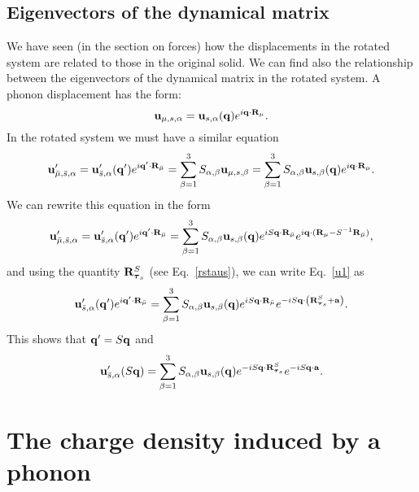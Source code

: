 \documentclass[12pt,a4paper,twoside]{report}
\begin{document}
\subsection{Eigenvectors of the dynamical matrix}
We have seen (in the section on forces) how the displacements in the rotated system are related to those in the original solid. We can find also the relationship between the eigenvectors of the dynamical matrix in the rotated system. A phonon displacement has
the form:
\begin{equation}
{\bf u}_{\mu,s,\alpha}= {\bf u}_{s,\alpha}({\bf q}) e^{i{\bf q}\cdot {\bf R}_\mu}.
\end{equation}
In the rotated system we must have a similar equation
\begin{equation}
{\bf u}'_{{\bar \mu},{\bar s},\alpha}= {\bf u}'_{{\bar s},\alpha}({\bf q}') e^{i{\bf q}'\cdot {\bf R}_{\bar \mu}}= \sum_{\beta=1}^3 S_{\alpha,\beta} {\bf u}_{\mu,s,\beta} = \sum_{\beta=1}^3 S_{\alpha,\beta} {\bf u}_{s,\beta}({\bf q}) e^{i{\bf q}\cdot {\bf R}_\mu}
\label{u1}.
\end{equation}
We can rewrite this equation in the form
\begin{equation}
{\bf u}'_{{\bar \mu},{\bar s},\alpha}= {\bf u}'_{{\bar s},\alpha}({\bf q}') e^{i{\bf q}'\cdot {\bf R}_{\bar \mu}}= \sum_{\beta=1}^3 S_{\alpha,\beta} {\bf u}_{s,\beta}({\bf q}) 
e^{iS {\bf q}\cdot {\bf R}_{\bar \mu} }
e^{i{\bf q}\cdot ({\bf R}_\mu - S^{-1} {\bf R}_{\bar \mu}) }, 
\label{u1}
\end{equation}
and using the quantity ${\bf R}^S_{\boldsymbol{\tau}_s}$ (see Eq.~\ref{rstaus}), we can write
Eq.~\ref{u1} as 
\begin{equation}
{\bf u}'_{{\bar s},\alpha}({\bf q}') e^{i{\bf q}'\cdot {\bf R}_{\bar \mu}}=\sum_{\beta=1}^3 S_{\alpha,\beta} {\bf u}_{s,\beta}({\bf q}) e^{iS {\bf q}\cdot {\bf R}_{\bar \mu}} e^{-i S {\bf q} \cdot \left({\bf R}^S_{\boldsymbol{\tau}_s} + {\bf a} \right)}.
\end{equation}
This shows that ${\bf q}'=S {\bf q}$ and 
\begin{equation}
{\bf u}'_{{\bar s},\alpha}(S {\bf q}) 
= \sum_{\beta=1}^3 S_{\alpha,\beta} {\bf u}_{s,\beta}({\bf q}) e^{-iS {\bf q} \cdot 
{\bf R}^S_{\boldsymbol{\tau}_s}}
e^{-iS {\bf q} \cdot {\bf a}}.
\end{equation}

\section{The charge density induced by a phonon}
\end{document}
